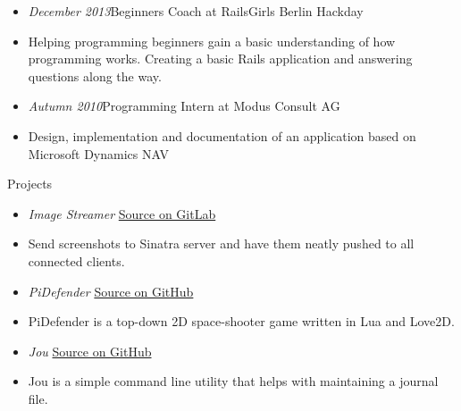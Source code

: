 \documentclass[12pt]{article}
\begin{document}
\begin{itemize}
  \setlength{\itemsep}{0cm}
  \setlength{\parskip}{0cm}

  \item[] \emph{December 2013}\hfill Beginners Coach at RailsGirls Berlin Hackday
  \item[] Helping programming beginners gain a basic understanding of how programming works. Creating a basic Rails application and answering questions along the way.
\end{itemize}

\begin{itemize}
  \setlength{\itemsep}{0cm}
  \setlength{\parskip}{0cm}

  \item[] \emph{Autumn 2010}\hfill Programming Intern at Modus Consult AG
  \item[] Design, implementation and documentation of an application based on Microsoft Dynamics NAV
\end{itemize}

\vspace{0.5cm}
{\Large Projects}

\begin{itemize}
  \setlength{\itemsep}{0cm}
  \setlength{\parskip}{0cm}
  \item[] \emph{Image Streamer} \hfill \href{https://gitlab.com/phansch/screenshot-streamer/tree/master}{Source on GitLab}

  \item[] Send screenshots to Sinatra server and have them neatly pushed to all connected clients.
\end{itemize}

\begin{itemize}
  \setlength{\itemsep}{0cm}
  \setlength{\parskip}{0cm}
  \item[] \emph{PiDefender} \hfill \href{https://gitlab.com/phansch/pidefender/tree/master}{Source on GitHub}

  \item[] PiDefender is a top-down 2D space-shooter game written in Lua and Love2D.
\end{itemize}


\begin{itemize}
  \setlength{\itemsep}{0cm}
  \setlength{\parskip}{0cm}
  \item[] \emph{Jou} \hfill \href{https://github.com/phansch/jou}{Source on GitHub}

  \item[] Jou is a simple command line utility that helps with maintaining a journal file.

\end{itemize}
\end{document}
